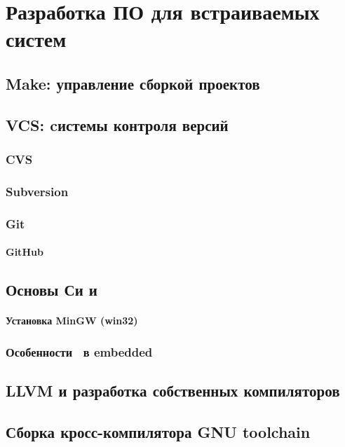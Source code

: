 \part{Разработка ПО для встраиваемых систем}





\chapter{Make: управление сборкой проектов}\label{make}

\chapter{VCS: cистемы контроля версий}\label{vcs}

\section{CVS}

\section{Subversion}

\section{Git}

\subsection{GitHub}

\chapter{Основы Си и \cpp}

\subsection{Установка MinGW (win32)}

\section{Особенности \cpp\ в embedded}

\chapter{LLVM и разработка собственных компиляторов}



\chapter{Сборка кросс-компилятора GNU toolchain}

